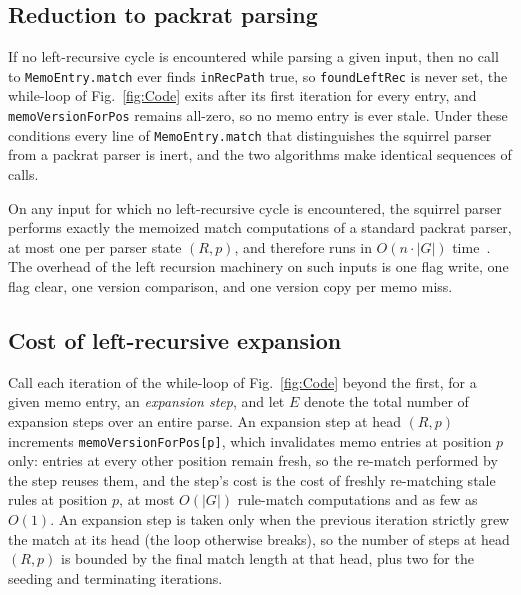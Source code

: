 \documentclass[manuscript]{acmart}
\newcommand{\cd}[1]{\texttt{#1}}
\begin{document}
\subsection{Reduction to packrat parsing}
\label{sec:packratreduction}

If no left-recursive cycle is encountered while parsing a given input, then no call to \cd{MemoEntry.match} ever finds \cd{inRecPath} true, so \cd{foundLeftRec} is never set, the while-loop of Fig.~\ref{fig:Code} exits after its first iteration for every entry, and \cd{memoVersionForPos} remains all-zero, so no memo entry is ever stale. Under these conditions every line of \cd{MemoEntry.match} that distinguishes the squirrel parser from a packrat parser is inert, and the two algorithms make identical sequences of calls.

\begin{theorem}
\label{thm:reduction}
On any input for which no left-recursive cycle is encountered, the squirrel parser performs exactly the memoized match computations of a standard packrat parser, at most one per parser state $(R, p)$, and therefore runs in $O(n \cdot |G|)$ time~\cite{ford2002}. The overhead of the left recursion machinery on such inputs is one flag write, one flag clear, one version comparison, and one version copy per memo miss.
\end{theorem}

\subsection{Cost of left-recursive expansion}
\label{sec:expansioncost}

Call each iteration of the while-loop of Fig.~\ref{fig:Code} beyond the first, for a given memo entry, an \emph{expansion step}, and let $E$ denote the total number of expansion steps over an entire parse. An expansion step at head $(R, p)$ increments \cd{memoVersionForPos[p]}, which invalidates memo entries at position $p$ only: entries at every other position remain fresh, so the re-match performed by the step reuses them, and the step's cost is the cost of freshly re-matching stale rules at position $p$, at most $O(|G|)$ rule-match computations and as few as $O(1)$. An expansion step is taken only when the previous iteration strictly grew the match at its head (the loop otherwise breaks), so the number of steps at head $(R, p)$ is bounded by the final match length at that head, plus two for the seeding and terminating iterations.
\end{document}
